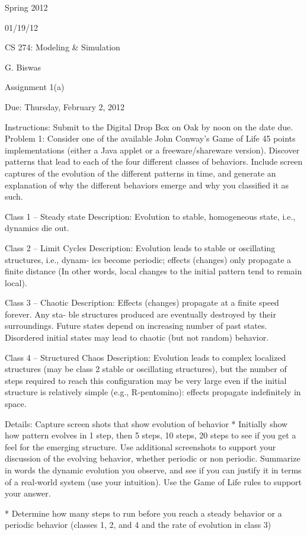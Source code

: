 Spring 2012

01/19/12

CS 274: Modeling & Simulation

G. Biswas

Assignment 1(a)

Due: Thursday, February 2, 2012

Instructions: Submit to the Digital Drop Box on Oak by noon on the date due.
Problem 1: Consider one of the available John Conway’s Game of Life
45 points implementations (either a Java applet or a freeware/shareware version).
Discover patterns that lead to each of the four different classes of behaviors.
Include screen captures of the evolution of the different patterns in time,
and generate an explanation of why the different behaviors emerge and why
you classified it as such.

Class 1 – Steady state
Description: Evolution to stable, homogeneous state, i.e., dynamics die out.

Class 2 – Limit Cycles
Description: Evolution leads to stable or oscillating structures, i.e., dynam-
ics become periodic; effects (changes) only propagate a finite distance
(In other words, local changes to the initial pattern tend to remain local).

Class 3 – Chaotic
Description: Effects (changes) propagate at a finite speed forever. Any sta-
ble structures produced are eventually destroyed by their surroundings.
Future states depend on increasing number of past states.
Disordered initial states may lead to chaotic (but not random) behavior.

Class 4 – Structured Chaos
Description: Evolution leads to complex localized structures (may be class
2 stable or oscillating structures), but the number of steps required to
reach this configuration may be very large even if the initial structure is
relatively simple (e.g., R-pentomino): effects propagate indefinitely in
space.

Details:
Capture screen shots that show evolution of behavior
* Initially show how pattern evolves in 1 step, then 5 steps, 10 steps, 20
steps to see if you get a feel for the emerging structure. Use additional
screenshots to support your discussion of the evolving behavior, whether
periodic or non periodic. Summarize in words the dynamic evolution you
observe, and see if you can justify it in terms of a real-world system (use
your intuition). Use the Game of Life rules to support your answer.

* Determine how many steps to run before you reach a steady behavior or
a periodic behavior (classes 1, 2, and 4 and the rate of evolution in class 3)

